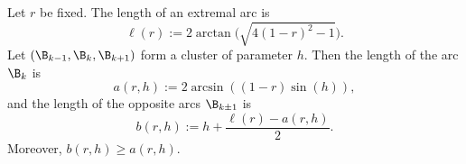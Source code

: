 \begin{proposition}\label{prop-clu} Let $r$ be fixed. The length of an extremal arc is
\begin{equation}\label{statement-l}
\ell(r):=2 \arctan\bigl(\sqrt{4(1-r)^2-1}\bigr).
\end{equation}
Let $(\B_{k-1}, \B_k, \B_{k+1})$ form a cluster of parameter $h$. Then the length of the arc $\B_k$ is
\begin{equation}\label{statement-a}
a(r,h):=2 \arcsin((1-r)\sin(h)),
\end{equation}
and the length of the opposite arcs $\B_{k\pm 1}$ is
\begin{equation}\label{statement-b}
b(r,h):=h + \frac{\ell(r)-a(r,h)}{2}.
\end{equation}
Moreover, $b(r,h)\geq a(r,h)$.
\end{proposition}


